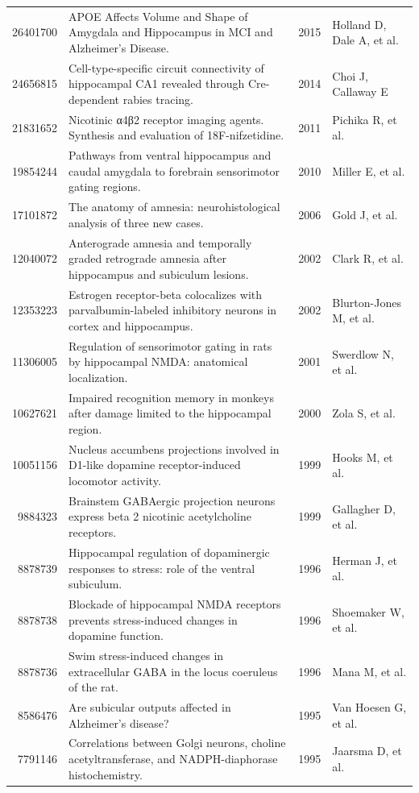 \documentclass{../latex/analysis_report}
\begin{document}
\begin{longtable}{rp{6cm}lp{2.5cm}}
26401700 & APOE Affects Volume and Shape of Amygdala and Hippocampus in MCI and Alzheimer's Disease. & 2015 & Holland D, Dale A, et al. \\
24656815 & Cell-type-specific circuit connectivity of hippocampal CA1 revealed through Cre-dependent rabies tracing. & 2014 & Choi J, Callaway E \\
21831652 & Nicotinic α4β2 receptor imaging agents. Synthesis and evaluation of 18F-nifzetidine. & 2011 & Pichika R, et al. \\
19854244 & Pathways from ventral hippocampus and caudal amygdala to forebrain sensorimotor gating regions. & 2010 & Miller E, et al. \\
17101872 & The anatomy of amnesia: neurohistological analysis of three new cases. & 2006 & Gold J, et al. \\
12040072 & Anterograde amnesia and temporally graded retrograde amnesia after hippocampus and subiculum lesions. & 2002 & Clark R, et al. \\
12353223 & Estrogen receptor-beta colocalizes with parvalbumin-labeled inhibitory neurons in cortex and hippocampus. & 2002 & Blurton-Jones M, et al. \\
11306005 & Regulation of sensorimotor gating in rats by hippocampal NMDA: anatomical localization. & 2001 & Swerdlow N, et al. \\
10627621 & Impaired recognition memory in monkeys after damage limited to the hippocampal region. & 2000 & Zola S, et al. \\
10051156 & Nucleus accumbens projections involved in D1-like dopamine receptor-induced locomotor activity. & 1999 & Hooks M, et al. \\
9884323 & Brainstem GABAergic projection neurons express beta 2 nicotinic acetylcholine receptors. & 1999 & Gallagher D, et al. \\
8878739 & Hippocampal regulation of dopaminergic responses to stress: role of the ventral subiculum. & 1996 & Herman J, et al. \\
8878738 & Blockade of hippocampal NMDA receptors prevents stress-induced changes in dopamine function. & 1996 & Shoemaker W, et al. \\
8878736 & Swim stress-induced changes in extracellular GABA in the locus coeruleus of the rat. & 1996 & Mana M, et al. \\
8586476 & Are subicular outputs affected in Alzheimer's disease? & 1995 & Van Hoesen G, et al. \\
7791146 & Correlations between Golgi neurons, choline acetyltransferase, and NADPH-diaphorase histochemistry. & 1995 & Jaarsma D, et al. \\

\end{longtable}
\end{document}
